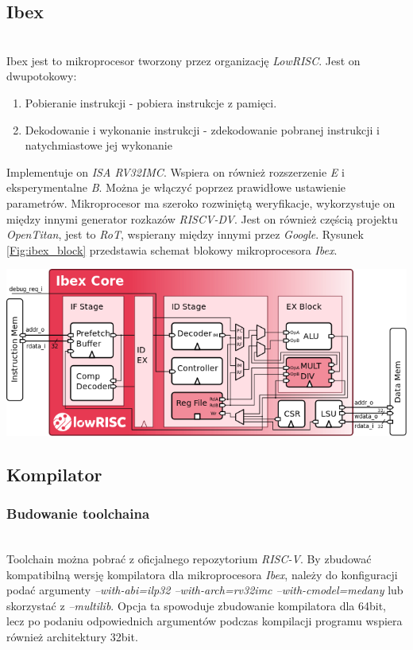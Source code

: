 \documentclass[11pt,a4paper]{article}
\begin{document}
	\subsection{Ibex}
	\hspace{5mm}
		\\Ibex jest to mikroprocesor tworzony przez organizację \textit{LowRISC}. Jest on dwupotokowy:
\begin{enumerate}
	\item Pobieranie instrukcji - pobiera instrukcje z pamięci.
	\item Dekodowanie i wykonanie instrukcji - zdekodowanie pobranej instrukcji i natychmiastowe jej wykonanie
\end{enumerate}		
		 Implementuje on \textit{ISA RV32IMC}. Wspiera on również rozszerzenie \textit{E} i eksperymentalne \textit{B}. Można je włączyć poprzez prawidłowe ustawienie parametrów\cite{ibex_doc}. Mikroprocesor ma szeroko rozwiniętą weryfikacje, wykorzystuje on między innymi generator rozkazów \textit{RISCV-DV}. Jest on również częścią projektu \textit{OpenTitan}, jest to \textit{RoT}, wspierany między innymi przez \textit{Google}\cite{google_opentitan}.
		Rysunek \ref{Fig:ibex_block} przedstawia schemat blokowy mikroprocesora \textit{Ibex}\cite{ibex_doc}.
			\begin{samepage}
				\nopagebreak
				\begin{center}
					\includegraphics[width=14cm]{./rysunki/blockdiagram.png}
				\end{center}
			\end{samepage}
	\subsection{Kompilator}
		\subsubsection{Budowanie toolchaina}
		\hspace{5mm}
			\\Toolchain można pobrać z oficjalnego repozytorium \textit{RISC-V}\cite{toolchain}. By zbudować kompatibilną wersję kompilatora dla mikroprocesora \textit{Ibex}, należy do konfiguracji podać argumenty \textit{--with-abi=ilp32 --with-arch=rv32imc --with-cmodel=medany} lub skorzystać z \textit{--multilib}. Opcja ta spowoduje zbudowanie kompilatora dla 64bit, lecz po podaniu odpowiednich argumentów podczas kompilacji programu wspiera również architektury 32bit.
\end{document}
